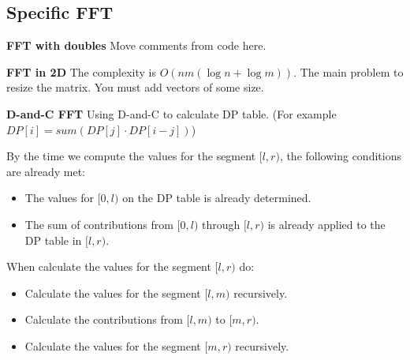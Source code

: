 \subsection{Specific FFT}

\textbf{FFT with doubles}
Move comments from code here.

\textbf{FFT in 2D}
The complexity is $O(nm(\log n + \log m))$.
The main problem to resize the matrix. You must add vectors of some size.

\textbf{D-and-C FFT}
Using D-and-C to calculate DP table. (For example $DP[i] = sum(DP[j] \cdot DP[i - j])$) 

By the time we compute the values for the segment $[l,r)$, the following conditions are already met:
\begin{itemize}
\item The values for $[0,l)$ on the DP table is already determined.
\item The sum of contributions from $[0,l)$ through $[l,r)$ is already applied to the DP table in $[l,r)$.
\end{itemize}

When calculate the values for the segment $[l, r)$ do:
\begin{itemize}
\item Calculate the values for the segment $[l,m)$ recursively.
\item Calculate the contributions from $[l,m)$ to $[m,r)$.
\item Calculate the values for the segment $[m,r)$ recursively.
\end{itemize}
